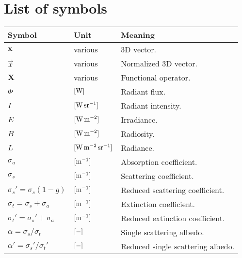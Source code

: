 \chapter*{List of symbols}
\label{sec:symbols}

\begin{tabular*}{\textwidth}{p{}p{}p{}}
\hline
\rowcolor{alexblue!50}
\textbf{Symbol} & \textbf{Unit} & \textbf{Meaning} \\ \hline
$\mathbf{x}$ & various & 3D vector. \\
$\vec{x}$ & various & Normalized 3D vector. \\
$\mathbf{X}$ & various & Functional operator. \\
$\Phi$ & $[\SI{}{W}]$ & Radiant flux. \\                                      
$I$ & $\siunitnospace{\watt \per \steradian}$ & Radiant intensity. \\                                      
$E$ & $[\SI{}{\watt \per \square \metre}]$ & Irradiance. \\                                      
$B$ & $[\SI{}{\watt \per \square \metre }]$ & Radiosity. \\                                      
$L$ & $\siunitnospace{\watt \per \square \metre \per \steradian}$ & Radiance. \\                                      
$\sigma_a$ & $[\SI{}{\per \metre}]$ & Absorption coefficient. \\                                      
$\sigma_s$ & $[\SI{}{\per \metre}]$ & Scattering coefficient. \\                                      
$\sigma_s' = \sigma_s (1-g)$ & $[\SI{}{\per \metre}]$ & Reduced scattering coefficient. \\                                      
$\sigma_t = \sigma_s + \sigma_a$ & $[\SI{}{\per \metre}]$ & Extinction coefficient. \\                                      
$\sigma_t' = \sigma_s' + \sigma_a$ & $[\SI{}{\per \metre}]$ & Reduced extinction coefficient. \\                                      
$\alpha = \sigma_s / \sigma_t $ & $[\SI{}{-}]$ & Single scattering albedo. \\
$\alpha' = \sigma_s' / \sigma_t' $ & $[\SI{}{-}]$ & Reduced single scattering albedo. \\                                      

\end{tabular*}
